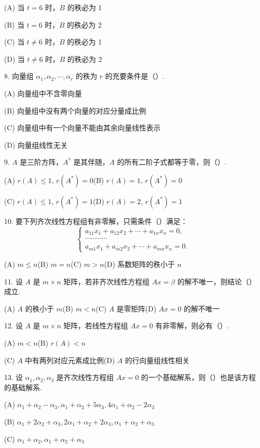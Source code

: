 \documentclass[UTF8,12pt,a4paper,fontset=fandol]{ctexart}
\begin{document}
(A) 当 $t=6$ 时，$B$ 的秩必为 1

(B) 当 $t=6$ 时，$B$ 的秩必为 2

(C) 当 $t\ne 6$ 时，$B$ 的秩必为 1

(D) 当 $t\ne 6$ 时，$B$ 的秩必为 2

8. 向量组 $\alpha_1,\alpha_2,\cdots,\alpha_r$ 的秩为 $r$ 的充要条件是（\quad）.

(A) 向量组中不含零向量

(B) 向量组中没有两个向量的对应分量成比例

(C) 向量组中有一个向量不能由其余向量线性表示

(D) 向量组线性无关

9. $A$ 是三阶方阵，$A^*$ 是其伴随，$A$ 的所有二阶子式都等于零，则（\quad）.

(A) $r(A)\le 1$, $r(A^*)=0$\qquad (B) $r(A)=1$, $r(A^*)=0$

(C) $r(A)\le 1$, $r(A^*)=1$\qquad (D) $r(A)=2$, $r(A^*)=1$

10. 要下列齐次线性方程组有非零解，只需条件（\quad）满足：
\[
\begin{cases}
a_{11}x_1+a_{12}x_2+\cdots+a_{1n}x_n=0,\\
\cdots\cdots\cdots\cdots\\
a_{m1}x_1+a_{m2}x_2+\cdots+a_{mn}x_n=0.
\end{cases}
\]

(A) $m\le n$\qquad (B) $m=n$\qquad (C) $m>n$\qquad (D) 系数矩阵的秩小于 $n$

11. 设 $A$ 是 $m\times n$ 矩阵，若非齐次线性方程组 $Ax=\beta$ 的解不唯一，则结论（\quad）成立.

(A) $A$ 的秩小于 $m$\qquad (B) $m<n$\qquad (C) $A$ 是零矩阵\qquad (D) $Ax=0$ 的解不唯一

12. 设 $A$ 是 $m\times n$ 矩阵，若线性方程组 $Ax=0$ 有非零解，则必有（\quad）.

(A) $m<n$\qquad (B) $r(A)<n$

(C) $A$ 中有两列对应元素成比例\qquad (D) $A$ 的行向量组线性相关

13. 设 $\alpha_1,\alpha_2,\alpha_3$ 是齐次线性方程组 $Ax=0$ 的一个基础解系，则（\quad）也是该方程的基础解系.

(A) $\alpha_1+\alpha_2-\alpha_3,\alpha_1+\alpha_2+5\alpha_3,4\alpha_1+\alpha_2-2\alpha_3$

(B) $\alpha_1+2\alpha_2+\alpha_3,2\alpha_1+\alpha_2+2\alpha_3,\alpha_1+\alpha_2+\alpha_3$

(C) $\alpha_1+\alpha_2,\alpha_1+\alpha_2+\alpha_3$
\end{document}
